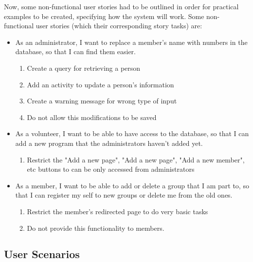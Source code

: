 \documentclass{l3proj}
\begin{document}
Now, some non-functional user stories had to be outlined in order for practical examples to be created, specifying how the system will work. Some non-functional user stories (which their corresponding story tasks) are:

\begin{itemize}
\item  As an administrator, I want to replace a member's name with numbers in the database, so that I can find them easier.

	\begin{enumerate}
	\item Create a query for retrieving a person
	\item Add an activity to update a person's information
	\item Create a warning message for wrong type of input
	\item Do not allow this modifications to be saved
	\end{enumerate}

\item As a volunteer, I want to be able to have access to the database, so that I can add a new program that the administrators haven't added yet.

	\begin{enumerate}
	\item Restrict the "Add a new page", "Add a new page", "Add a new member", etc buttons to can be only accessed from administrators
	\end{enumerate}

\item As a member, I want to be able to add or delete a group that I am part to, so that I can register my self to new groups or delete me from the old ones.

	\begin{enumerate}
	\item Restrict the member's redirected page to do very basic tasks
	\item Do not provide this functionality to members.
	\end{enumerate}
\end{itemize}

\subsection{User Scenarios}
\label{user_scenarios}
\end{document}
